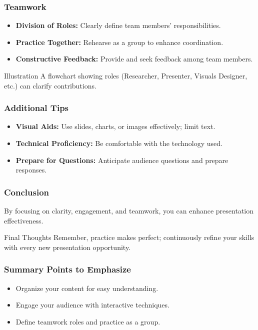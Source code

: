 \documentclass[aspectratio=169]{beamer}
\begin{document}
\begin{frame}[fragile]
    \frametitle{Teamwork}
    \begin{itemize}
        \item \textbf{Division of Roles:} Clearly define team members' responsibilities.
        \item \textbf{Practice Together:} Rehearse as a group to enhance coordination.
        \item \textbf{Constructive Feedback:} Provide and seek feedback among team members.
    \end{itemize}
    \begin{block}{Illustration}
        A flowchart showing roles (Researcher, Presenter, Visuals Designer, etc.) can clarify contributions.
    \end{block}
\end{frame}

\begin{frame}[fragile]
    \frametitle{Additional Tips}
    \begin{itemize}
        \item \textbf{Visual Aids:} Use slides, charts, or images effectively; limit text.
        \item \textbf{Technical Proficiency:} Be comfortable with the technology used.
        \item \textbf{Prepare for Questions:} Anticipate audience questions and prepare responses.
    \end{itemize}
\end{frame}

\begin{frame}[fragile]
    \frametitle{Conclusion}
    By focusing on clarity, engagement, and teamwork, you can enhance presentation effectiveness. 
    \begin{block}{Final Thoughts}
        Remember, practice makes perfect; continuously refine your skills with every new presentation opportunity.
    \end{block}
\end{frame}

\begin{frame}[fragile]
    \frametitle{Summary Points to Emphasize}
    \begin{itemize}
        \item Organize your content for easy understanding.
        \item Engage your audience with interactive techniques.
        \item Define teamwork roles and practice as a group.
    \end{itemize}
\end{frame}
\end{document}
